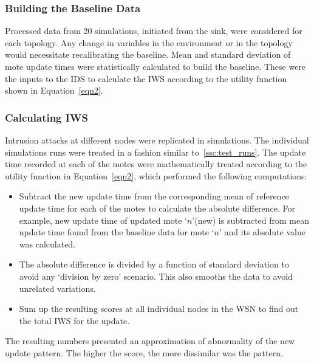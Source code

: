 \documentclass[conference,final]{IEEEtran}
\begin{document}

\subsubsection*{Building the Baseline Data}
\label{ssc:build_baseline}
Processed data from 20 simulations, initiated from the sink, were considered for each topology.
Any change in variables in the environment or in the topology would necessitate recalibrating the baseline.
Mean and standard deviation of mote update times were statistically calculated to build the baseline.
These were the inputs to the IDS to calculate the IWS according to the utility function shown in Equation~\ref{eqn2}. 

\subsubsection*{Calculating IWS}
\label{ssc:calc_iws}

Intrusion attacks at different nodes were replicated in simulations.
The individual simulations runs were treated in a fashion  similar to~\ref{ssc:test_runs}.
The update time recorded at each of the motes were mathematically treated according to the utility function in Equation~\ref{eqn2}, which performed the following computations:
\begin{itemize}
\item Subtract the new update time from the corresponding mean of reference update time for each of the motes to calculate the absolute difference. For example, new update time of updated mote `$n$'(new) is subtracted from mean update time found from the baseline data for mote `$n$' and its absolute value was calculated.
\item The absolute difference is divided by a function of standard deviation to avoid any `division by zero' scenario. This also smooths the data to avoid unrelated variations.
\item Sum up the resulting scores at all individual nodes in the WSN to find out the total IWS for the update.
\end{itemize}
The resulting numbers  presented an approximation of abnormality of the new update pattern. The higher the score, the more dissimilar was the pattern. 
\end{document}

